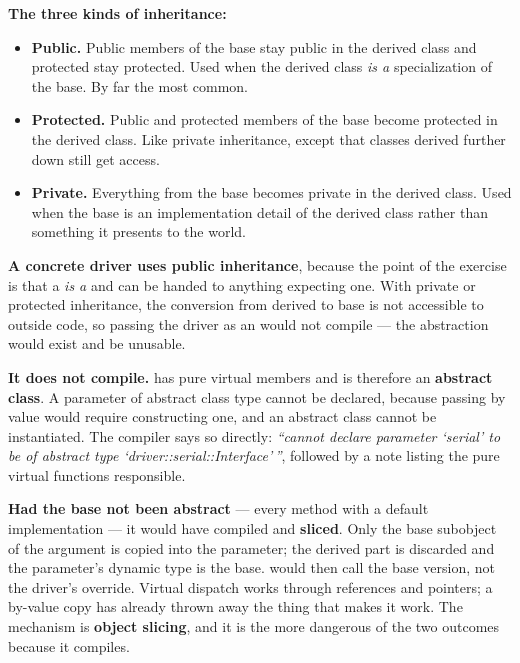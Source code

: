 \textbf{The three kinds of inheritance:} 
\begin{itemize}
  \item \textbf{Public.} Public members of the base stay public in the derived class and protected
    stay protected. Used when the derived class \emph{is a} specialization of the base. By far the
    most common.
  \item \textbf{Protected.} Public and protected members of the base become protected in the derived
    class. Like private inheritance, except that classes derived further down still get access.
  \item \textbf{Private.} Everything from the base becomes private in the derived class. Used when
    the base is an implementation detail of the derived class rather than something it presents to
    the world.
\end{itemize}

\textbf{A concrete driver uses public inheritance}, because the point of the exercise is that a
 \emph{is a}  and can be handed to
anything expecting one. With private or protected inheritance, the conversion from derived to base
is not accessible to outside code, so passing the driver as an  would not compile
--- the abstraction would exist and be unusable. 

\textbf{It does not compile.}  has pure virtual members and is therefore an
\textbf{abstract class}. A parameter of abstract class type cannot be declared, because passing by
value would require constructing one, and an abstract class cannot be instantiated. The compiler
says so directly: \emph{``cannot declare parameter `serial' to be of abstract type
`driver::serial::Interface'\,''}, followed by a note listing the pure virtual functions responsible.

\textbf{Had the base not been abstract} --- every method with a default implementation --- it would
have compiled and \textbf{sliced}. Only the base subobject of the argument is copied into the
parameter; the derived part is discarded and the parameter's dynamic type is the base.
 would then call the base version, not the driver's override. Virtual
dispatch works through references and pointers; a by-value copy has already thrown away the thing
that makes it work. The mechanism is \textbf{object slicing}, and it is the more dangerous of the
two outcomes because it compiles. 


